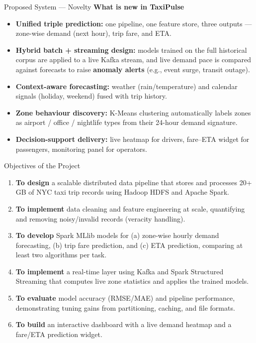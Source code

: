 \documentclass[aspectratio=169]{beamer}
\begin{document}
\begin{frame}{Proposed System --- Novelty}
  \textbf{What is new in TaxiPulse}
  \begin{itemize}
    \item \textbf{Unified triple prediction:} one pipeline, one feature store,
          three outputs --- zone-wise demand (next hour), trip fare, and ETA.
    \item \textbf{Hybrid batch + streaming design:} models trained on the full
          historical corpus are applied to a live Kafka stream, and live demand
          pace is compared against forecasts to raise \textbf{anomaly alerts}
          (e.g., event surge, transit outage).
    \item \textbf{Context-aware forecasting:} weather (rain/temperature) and
          calendar signals (holiday, weekend) fused with trip history.
    \item \textbf{Zone behaviour discovery:} K-Means clustering automatically
          labels zones as airport / office / nightlife types from their
          24-hour demand signature.
    \item \textbf{Decision-support delivery:} live heatmap for drivers,
          fare--ETA widget for passengers, monitoring panel for operators.
  \end{itemize}
\end{frame}

\begin{frame}{Objectives of the Project}
  \begin{enumerate}
    \item \textbf{To design} a scalable distributed data pipeline that stores and
          processes 20+ GB of NYC taxi trip records using Hadoop HDFS and Apache Spark.
    \item \textbf{To implement} data cleaning and feature engineering at scale,
          quantifying and removing noisy/invalid records (veracity handling).
    \item \textbf{To develop} Spark MLlib models for (a) zone-wise hourly demand
          forecasting, (b) trip fare prediction, and (c) ETA prediction,
          comparing at least two algorithms per task.
    \item \textbf{To implement} a real-time layer using Kafka and Spark Structured
          Streaming that computes live zone statistics and applies the trained models.
    \item \textbf{To evaluate} model accuracy (RMSE/MAE) and pipeline performance,
          demonstrating tuning gains from partitioning, caching, and file formats.
    \item \textbf{To build} an interactive dashboard with a live demand heatmap
          and a fare/ETA prediction widget.
  \end{enumerate}
\end{frame}
\end{document}
